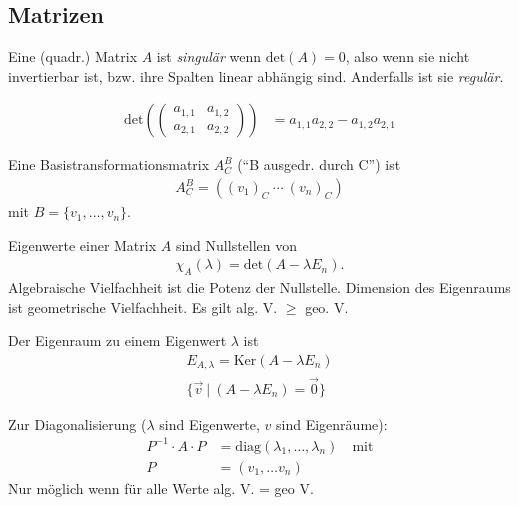 \documentclass{article}
\begin{document}
\begin{multicols}{2}
\section*{Matrizen}

Eine (quadr.) Matrix $A$ ist \emph{singulär} wenn $\text{det}(A) = 0$, also wenn sie nicht invertierbar ist, bzw. ihre Spalten linear abhängig sind. Anderfalls ist sie \emph{regulär}.

\begin{align*}
    \text{det}\left(\begin{pmatrix*}
        a_{1,1} & a_{1,2} \\
        a_{2,1} & a_{2,2}
    \end{pmatrix*}\right) &= a_{1,1}a_{2,2} - a_{1,2}a_{2,1}
\end{align*}

Eine Basistransformationsmatrix $A_C^B$ (\enquote{B ausgedr. durch C}) ist
\begin{align*}
    A_C^B = \left((v_1)_C\ \cdots\ (v_n)_C\right)
\end{align*}
mit $B = \{ v_1, \ldots, v_n \}$.

Eigenwerte einer Matrix $A$ sind Nullstellen von
\begin{align*}
    \chi_A(\lambda) = \text{det}(A - \lambda E_n).
\end{align*}
Algebraische Vielfachheit ist die Potenz der Nullstelle. Dimension des Eigenraums ist geometrische Vielfachheit. Es gilt alg. V. $\geq$ geo. V.

Der Eigenraum zu einem Eigenwert $\lambda$ ist
\begin{align*}
    E_{A,\lambda} = \text{Ker}(A - \lambda E_n) \\
    \{ \vec{v}\ |\ (A - \lambda E_n) = \vec{0} \}
\end{align*}

Zur Diagonalisierung ($\lambda$ sind Eigenwerte, $v$ sind Eigenräume):
\begin{align*}
    P^{-1} \cdot A \cdot P &= \text{diag}(\lambda_1, \ldots, \lambda_n) \quad \text{mit} \\ 
    P &= (v_1, \ldots v_n)
\end{align*}
Nur möglich wenn für alle Werte alg. V. = geo V.


\end{multicols}
\end{document}

